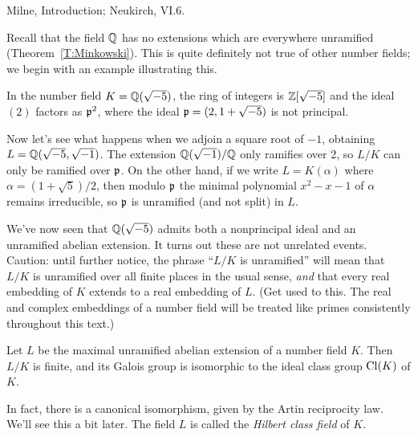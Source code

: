 %
%
%
%
%
%
%

 Milne, Introduction; Neukirch, VI.6.

\medskip

Recall that the field $\mathbb{Q}$ has no extensions which are everywhere
unramified (Theorem~\ref{T:Minkowski}). This is quite definitely not true of other
number fields; we begin with an example illustrating this.

In the number field $K = \mathbb{Q}(\sqrt{-5})$, the ring of integers is
$\mathbb{Z}[\sqrt{-5}]$ and the ideal $(2)$ factors as $\mathfrak{p}^2$,
where the ideal $\mathfrak{p} = (2, 1 + \sqrt{-5})$ is not principal.

Now let's see what happens when we adjoin a square root of $-1$,
obtaining $L = \mathbb{Q}(\sqrt{-5}, \sqrt{-1})$. The
extension $\mathbb{Q}(\sqrt{-1})/\mathbb{Q}$ only ramifies over 2, so
$L/K$ can only be ramified over $\mathfrak{p}$.
On the other hand, if we write $L = K(\alpha)$ where $\alpha =
(1 + \sqrt{5})/2$, then modulo $\mathfrak{p}$ 
the minimal polynomial $x^2-x-1$ of $\alpha$ remains irreducible, so $\mathfrak{p}$
is unramified (and not split) in $L$. 

We've now seen that $\mathbb{Q}(\sqrt{-5})$ admits both a nonprincipal ideal and
an unramified abelian extension. It turns out these are not unrelated events.
Caution: until further notice, the phrase ``$L/K$ is unramified'' will mean
that $L/K$ is unramified over all finite places in the usual sense, \emph{and}
that every real embedding of $K$ extends to a real embedding of $L$. 
(Get used to this. The real and complex embeddings of a number field will
be treated like primes consistently throughout this text.)
\begin{theorem} \label{T:Hilbert class field}
Let $L$ be the maximal unramified
abelian extension of a number field $K$.
Then $L/K$ is finite, and its Galois group is isomorphic to
the ideal class group $\operatorname{Cl}(K)$ of $K$.
\end{theorem}
In fact, there is a canonical isomorphism, given by the Artin reciprocity
law. We'll see this a bit later. The field $L$ is called the \emph{Hilbert
class field} of $K$.

